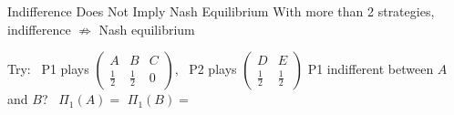 \begin{frame}{Indifference Does Not Imply Nash Equilibrium}
With more than 2 strategies, indifference $\not\Rightarrow$ Nash equilibrium
\centering
\begin{matrixgame}[top={D, E}, left={A, B, C}, player names={Player 1, Player 2}]
\end{matrixgame}
\bsk
\raggedright
Try: \ P1 plays $\begin{pmatrix} A & B & C \\ \tfrac12 & \tfrac12 & 0\end{pmatrix}$, \ P2 plays $\begin{pmatrix} D & E \\ \tfrac12 & \tfrac12\end{pmatrix}$
\bsk
P1 indifferent between $A$ and $B$? \ $\Pi_1(A)=$ \hspace{0.6in} $\Pi_1(B)=$
\bsk
{}
\vfill
{}
\vspace{-0.3in}
\end{frame}

